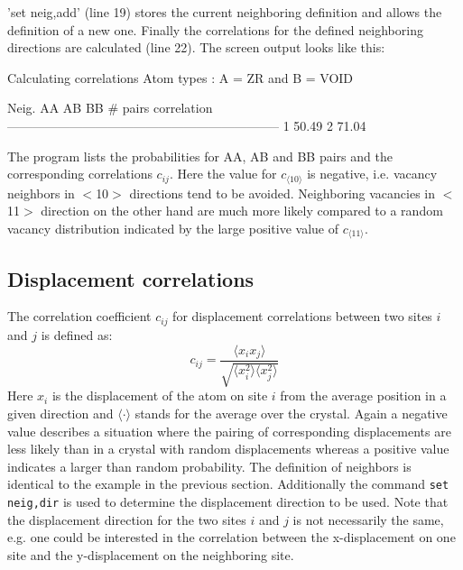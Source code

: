'set neig,add' (line 19) stores the current neighboring definition
and allows the definition of a new one.  Finally the correlations
for the defined neighboring directions are calculated (line 22). The
screen output looks like this:
%
\begin{MacVerbatim}
    Calculating correlations
        Atom types : A = ZR   and B = VOID

        Neig.     AA         AB         BB         # pairs    correlation
        -----------------------------------------------------------------
           1    50.49 %
           2    71.04 %
\end{MacVerbatim}
%
The program lists the probabilities for AA, AB and BB pairs and the
corresponding correlations $c_{ij}$.  Here the value for $c_{\langle
10 \rangle}$ is negative, i.e.  vacancy neighbors in $<$10$>$
directions tend to be avoided.  Neighboring vacancies in $<$11$>$
direction on the other hand are much more likely compared to a
random vacancy distribution indicated by the large positive value of
$c_{\langle 11 \rangle}$.

\subsection*{Displacement correlations \label{chem-corr-disp}}

The correlation coefficient $c_{ij}$ for displacement correlations
between two sites $i$ and $j$ is defined as:
%
\begin{equation}
    c_{ij} = \frac { \langle x_{i} x_{j} \rangle }
                   { \sqrt { \langle x_{i}^{2} \rangle
                             \langle x_{j}^{2} \rangle } }
    \label{chem-eq2}
\end{equation}
%
Here $x_{i}$ is the displacement of the atom on site $i$ from the
average position in a given direction and $\langle \cdot \rangle$
stands for the average over the crystal.  Again a negative value
describes a situation where the pairing of corresponding
displacements are less likely than in a crystal with random
displacements whereas a positive value indicates a larger than
random probability. The definition of neighbors is identical to the
example in the previous section.  Additionally the command {\tt set
neig,dir} is used to determine the displacement direction to be
used. Note that the displacement direction for the two sites $i$ and
$j$ is not necessarily the same, e.g.  one could be interested in
the correlation between the x-displacement on one site and the
y-displacement on the neighboring site.


